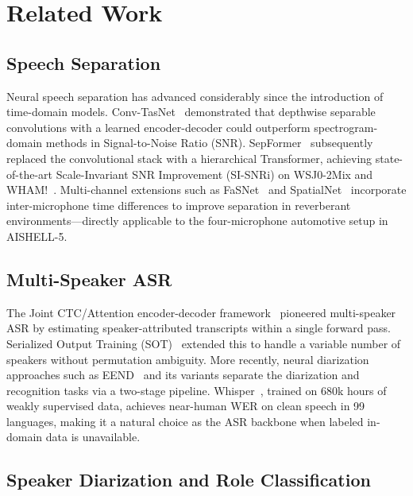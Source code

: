 
\section{Related Work}
\label{sec:related}

\subsection{Speech Separation}

Neural speech separation has advanced considerably since the introduction
of time-domain models. Conv-TasNet~\cite{luo2019conv} demonstrated that
depthwise separable convolutions with a learned encoder-decoder could
outperform spectrogram-domain methods in Signal-to-Noise Ratio (SNR).
SepFormer~\cite{subakan2021attention} subsequently replaced the convolutional
stack with a hierarchical Transformer, achieving state-of-the-art
Scale-Invariant SNR Improvement (SI-SNRi) on WSJ0-2Mix and WHAM!~\cite{wichern2019wham}.
Multi-channel extensions such as FaSNet~\cite{luo2020end} and
SpatialNet~\cite{wang2023tf} incorporate inter-microphone time differences
to improve separation in reverberant environments—directly applicable to
the four-microphone automotive setup in AISHELL-5.

\subsection{Multi-Speaker ASR}

The Joint CTC/Attention encoder-decoder framework~\cite{watanabe2017hybrid}
pioneered multi-speaker ASR by estimating speaker-attributed transcripts
within a single forward pass. Serialized Output Training (SOT)~\cite{kanda2020serialized}
extended this to handle a variable number of speakers without permutation
ambiguity. More recently, neural diarization approaches such as
EEND~\cite{fujita2019end} and its variants separate the diarization and
recognition tasks via a two-stage pipeline. Whisper~\cite{radford2023robust},
trained on 680k hours of weakly supervised data, achieves near-human WER
on clean speech in 99 languages, making it a natural choice as the ASR
backbone when labeled in-domain data is unavailable.

\subsection{Speaker Diarization and Role Classification}

